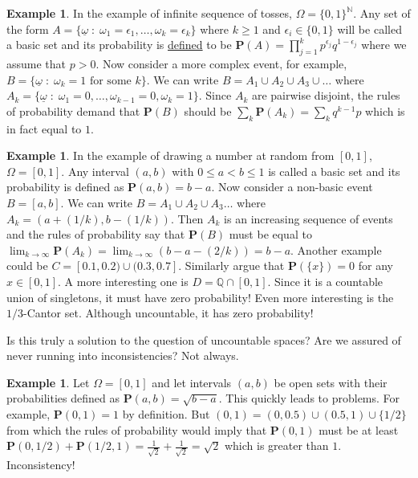 \documentclass[preprint,  11pt]{amsart}
\newcommand{\para}[1]{\vspace{4mm}\noindent{\bfseries #1:}}
\def\ome{\omega}
\theoremstyle{plain} %
\theoremstyle{definition} %
\newtheorem{example}[theorem]{Example}
\begin{document}
{\begin{example} In the example of infinite sequence of tosses, $\Omega=\{0,1\}^{\mathbb{N}}$. Any set of the form $A=\{\underline{\ome}{\; : \;} \omega_{1}=\epsilon_{1},\ldots ,\omega_{k}=\epsilon_{k}\}$ where $k\ge 1$ and $\epsilon_{i}\in \{0,1\}$ will be called a basic set and its probability is \underline{defined} to be $\mathbf{P}(A)=\prod_{j=1}^{k}p^{\epsilon_{j}}q^{1-\epsilon_{j}}$ where we assume that $p>0$. Now consider a more complex event, for example, $B=\{\underline{\ome} {\; : \;} \omega_{k}=1\mbox{ for some }k\}$. We can write $B=A_{1}\cup A_{2}\cup A_{3}\cup\ldots$ where $A_{k}=\{\underline{\ome}{\; : \;} \omega_{1}=0,\ldots ,\omega_{k-1}=0,\omega_{k}=1\}$. Since $A_{k}$ are pairwise disjoint, the rules of probability demand that $\mathbf{P}(B)$ should be $\sum_{k}\mathbf{P}(A_{k})=\sum_{k}q^{k-1}p$ which is in fact equal to $1$.
\end{example}
\begin{example} In the example of drawing a number at random from $[0,1]$, $\Omega=[0,1]$. Any interval $(a,b)$ with $0\le a<b\le 1$ is called a basic set and its probability is defined as $\mathbf{P}(a,b)=b-a$. Now consider a non-basic event $B=[a,b]$. We can write $B=A_{1}\cup A_{2}\cup A_{3}\ldots$ where $A_{k}=(a+(1/k),b-(1/k))$. Then $A_{k}$ is an increasing sequence of events and the rules of probability say that $\mathbf{P}(B)$ must be equal to $\lim_{k\rightarrow \infty}\mathbf{P}(A_{k})=\lim_{k\rightarrow \infty}(b-a-(2/k)) = b-a$. Another example could be $C=[0.1,0.2)\cup(0.3,0.7]$. Similarly argue that $\mathbf{P}(\{x\})=0$ for any $x\in [0,1]$. A more interesting one is $D=\mathbb Q \cap [0,1]$. Since it is a countable union of singletons, it must have zero probability! Even more interesting is the $1/3$-Cantor set. Although uncountable, it has zero probability!
\end{example}
 
\para{Consistency} Is this truly a solution to the question of uncountable spaces? Are we assured of never running into inconsistencies? Not always. 
\begin{example} Let $\Omega=[0,1]$ and let intervals $(a,b)$ be open sets with their probabilities defined as $\mathbf{P}(a,b)=\sqrt{b-a}$. This quickly leads to problems. For example, $\mathbf{P}(0,1)=1$ by definition. But $(0,1)=(0,0.5)\cup(0.5,1)\cup \{1/2\}$ from which the rules of probability would imply that $\mathbf{P}(0,1)$ must be at least $\mathbf{P}(0,1/2)+\mathbf{P}(1/2,1)=\frac{1}{\sqrt{2}}+\frac{1}{\sqrt{2}}=\sqrt{2}$ which is greater than $1$. Inconsistency!
\end{example}

}
\end{document}
